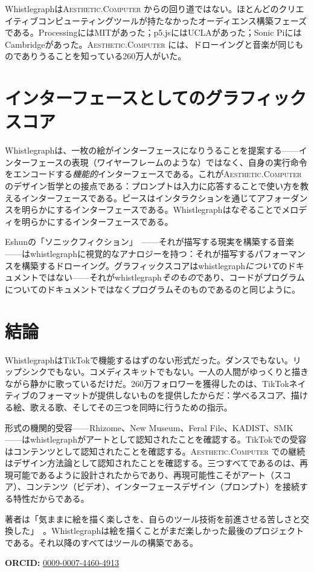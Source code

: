 \documentclass[10pt,letterpaper,twocolumn]{article}
\newcommand{\ac}{\textsc{Aesthetic.Computer}}
\begin{document}
Whistlegraphは\ac{} からの回り道ではない。ほとんどのクリエイティブコンピューティングツールが持たなかったオーディエンス構築フェーズである。ProcessingにはMITがあった；p5.jsにはUCLAがあった；Sonic PiにはCambridgeがあった。\ac{} には、ドローイングと音楽が同じものでありうることを知っている260万人がいた。

\section{インターフェースとしてのグラフィックスコア}

Whistlegraphは、一枚の絵がインターフェースになりうることを提案する——インターフェースの表現（ワイヤーフレームのような）ではなく、自身の実行命令をエンコードする\emph{機能的}インターフェースである。これが\ac{} のデザイン哲学との接点である：プロンプトは入力に応答することで使い方を教えるインターフェースである。ピースはインタラクションを通じてアフォーダンスを明らかにするインターフェースである。Whistlegraphはなぞることでメロディを明らかにするインターフェースである。

Eshunの「ソニックフィクション」~\citep{eshun1998more}——それが描写する現実を構築する音楽——はwhistlegraphに視覚的なアナロジーを持つ：それが描写するパフォーマンスを構築するドローイング。グラフィックスコアはwhistlegraph\emph{について}のドキュメントではない——それがwhistlegraph\emph{そのもの}であり、コードがプログラムについてのドキュメントではなくプログラムそのものであるのと同じように。

\section{結論}

WhistlegraphはTikTokで機能するはずのない形式だった。ダンスでもない。リップシンクでもない。コメディスキットでもない。一人の人間がゆっくりと描きながら静かに歌っているだけだ。260万フォロワーを獲得したのは、TikTokネイティブのフォーマットが提供しないものを提供したからだ：学べるスコア、描ける絵、歌える歌、そしてその三つを同時に行うための指示。

形式の機関的受容——Rhizome、New Museum、Feral File、KADIST、SMK——はwhistlegraphがアートとして認知されたことを確認する。TikTokでの受容はコンテンツとして認知されたことを確認する。\ac{} での継続はデザイン方法論として認知されたことを確認する。三つすべてであるのは、再現可能であるように設計されたからであり、再現可能性こそがアート（スコア）、コンテンツ（ビデオ）、インターフェースデザイン（プロンプト）を接続する特性だからである。

著者は「気ままに絵を描く楽しさを、自らのツール技術を前進させる苦しさと交換した」~\citep{scudder2019drawing}。Whistlegraphは絵を描くことがまだ楽しかった最後のプロジェクトである。それ以降のすべてはツールの構築である。

\vspace{0.5em}
\noindent\textbf{ORCID:} \href{https://orcid.org/0009-0007-4460-4913}{0009-0007-4460-4913}



\end{document}
